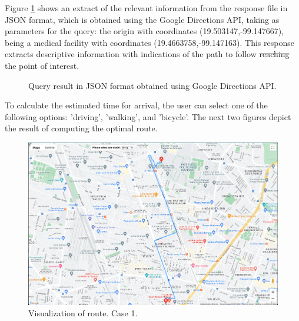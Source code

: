 \documentclass[sustainability,article,submit,pdftex,moreauthors]{Definitions/mdpi}
\providecommand{\DIFadd}[1]{{\protect\color{blue}\uwave{#1}}} %
\providecommand{\DIFdel}[1]{{\protect\color{red}\sout{#1}}}                      %
\providecommand{\DIFaddbegin}{} %
\providecommand{\DIFaddend}{} %
\providecommand{\DIFdelbegin}{} %
\providecommand{\DIFdelend}{} %
\providecommand{\DIFaddFL}[1]{\DIFadd{#1}} %
\providecommand{\DIFaddbeginFL}{} %
\providecommand{\DIFaddendFL}{} %
\providecommand{\DIFdelbeginFL}{} %
\providecommand{\DIFdelendFL}{} %
\begin{document}
Figure \ref{figure_query_one} shows an extract of the relevant information from the response file in JSON format, which is obtained using the Google Directions API, taking as parameters for the query: the origin with coordinates (19.503147,-99.147667), being a medical facility with coordinates (19.4663758,-99.147163). This response extracts descriptive information with indications of the path to follow \DIFdelbegin \DIFdel{reaching }\DIFdelend \DIFaddbegin \DIFadd{to reach }\DIFaddend the point of interest.

\begin{figure}[H]
\DIFdelbeginFL %
\DIFdelendFL %
\DIFaddbeginFL 
\DIFaddendFL \caption{Query result in JSON format obtained using Google Directions API. \\\label{figure_query_one}}
\end{figure}
\unskip

To calculate the estimated time for arrival, the user can select one of the following options: 'driving', 'walking', and 'bicycle'. The next two figures depict the result of computing the optimal route.


\begin{figure}[H]
\includegraphics[width=10.5 cm]{ruta_uno.png}
\caption{Visualization of \DIFaddbeginFL \DIFaddFL{the }\DIFaddendFL route. Case 1.\label{figure_ruta_uno}}
\end{figure}
\DIFdelbegin %
\DIFdelend %
\end{document}
